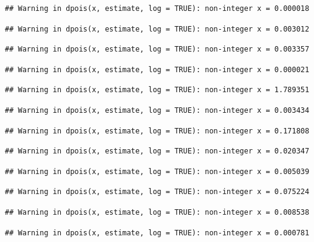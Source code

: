 \documentclass[]{article}
\begin{document}
\begin{verbatim}
## Warning in dpois(x, estimate, log = TRUE): non-integer x = 0.000018
\end{verbatim}

\begin{verbatim}
## Warning in dpois(x, estimate, log = TRUE): non-integer x = 0.003012
\end{verbatim}

\begin{verbatim}
## Warning in dpois(x, estimate, log = TRUE): non-integer x = 0.003357
\end{verbatim}

\begin{verbatim}
## Warning in dpois(x, estimate, log = TRUE): non-integer x = 0.000021
\end{verbatim}

\begin{verbatim}
## Warning in dpois(x, estimate, log = TRUE): non-integer x = 1.789351
\end{verbatim}

\begin{verbatim}
## Warning in dpois(x, estimate, log = TRUE): non-integer x = 0.003434
\end{verbatim}

\begin{verbatim}
## Warning in dpois(x, estimate, log = TRUE): non-integer x = 0.171808
\end{verbatim}

\begin{verbatim}
## Warning in dpois(x, estimate, log = TRUE): non-integer x = 0.020347
\end{verbatim}

\begin{verbatim}
## Warning in dpois(x, estimate, log = TRUE): non-integer x = 0.005039
\end{verbatim}

\begin{verbatim}
## Warning in dpois(x, estimate, log = TRUE): non-integer x = 0.075224
\end{verbatim}

\begin{verbatim}
## Warning in dpois(x, estimate, log = TRUE): non-integer x = 0.008538
\end{verbatim}

\begin{verbatim}
## Warning in dpois(x, estimate, log = TRUE): non-integer x = 0.000781
\end{verbatim}
\end{document}
